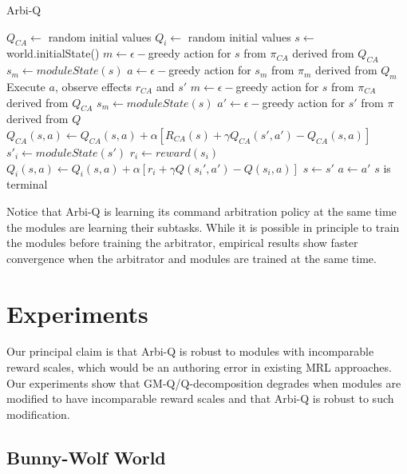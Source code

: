 \begin{algorithm}
  \caption{Arbi-Q}\label{alg:arbiq}
  \begin{algorithmic}
    \State $Q_{CA} \gets$ random initial values
       \State $Q_{i} \gets$ random initial values
    \EndFor
      \State $s \gets$ world.initialState()
      \State $m \gets \epsilon-$greedy action for $s$ from $\pi_{CA}$ derived from $Q_{CA}$ 
      \State $s_{m} \gets moduleState(s)$ 
      \State $a \gets \epsilon-$greedy action for $s_{m}$ from $\pi_m$ derived from $Q_m$
      \Repeat
        \State Execute $a$, observe effects $r_{CA}$ and $s'$
        \State $m \gets \epsilon-$greedy action for $s$ from $\pi_{CA}$ derived from $Q_{CA}$ 
        \State $s_{m} \gets moduleState(s)$ 
        \State $a' \gets \epsilon-$greedy action for $s'$ from $\pi$ derived from $Q$
        \State $Q_{CA}(s, a) \gets Q_{CA}(s, a) + \alpha [R_{CA}(s) + \gamma Q_{CA}(s', a') - Q_{CA}(s, a)]$
          \State $s'_{i} \gets moduleState(s')$ 
          \State $r_i \gets reward(s_i)$ 
          \State $Q_i(s, a) \gets Q_i(s, a) + \alpha [r_i + \gamma Q(s_i', a') - Q(s_i, a)]$
        \EndFor
        \State $s \gets s'$
        \State $a \gets a'$
      \Until $s$ is terminal
    \EndFor
  \end{algorithmic}
\end{algorithm}

Notice that Arbi-Q is learning its command arbitration policy at the same time the modules are learning their subtasks. While it is possible in principle to train the modules before training the arbitrator, empirical results show faster convergence when the arbitrator and modules are trained at the same time.

\section{Experiments}

Our principal claim is that Arbi-Q is robust to modules with incomparable reward scales, which would be an authoring error in existing MRL approaches. Our experiments show that GM-Q/Q-decomposition degrades when modules are modified to have incomparable reward scales and that Arbi-Q is robust to such modification.

\subsection{Bunny-Wolf World}


